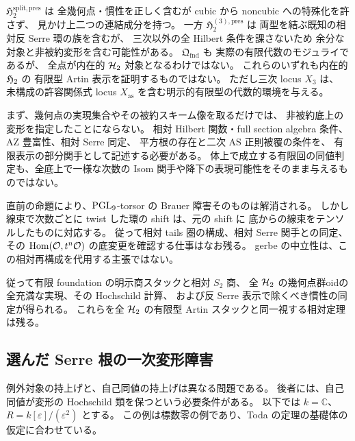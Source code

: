 \begin{remark}
$\mathfrak H_2^{\mathrm{split,pres}}$ は
全幾何点・慣性を正しく含むが
cubic から noncubic への特殊化を許さず、
見かけ上二つの連結成分を持つ。
一方 $\mathfrak H_2^{(3),\mathrm{pres}}$ は
両型を結ぶ既知の相対反 Serre 環の族を含むが、
三次以外の全 Hilbert 条件を課さないため
余分な対象と非被約変形を含む可能性がある。
$\mathfrak Q_{\mathrm{fnd}}$ も
実際の有限代数のモジュライであるが、
全点が内在的 $\mathcal H_2$ 対象となるわけではない。
これらのいずれも内在的 $\mathfrak H_2$ の
有限型 Artin 表示を証明するものではない。
ただし三次 locus $X_3$ は、
未構成の許容関係式 locus $X_{\mathrm{as}}$
を含む明示的有限型の代数的環境を与える。
\end{remark}

\begin{remark}
まず、幾何点の実現集合やその被約スキーム像を取るだけでは、
非被約底上の変形を指定したことにならない。
相対 Hilbert 関数・full section algebra 条件、AZ 豊富性、相対 Serre 同定、
平方根の存在と二次 AS 正則被覆の条件を、
有限表示の部分関手として記述する必要がある。
体上で成立する有限回の同値判定も、全底上で一様な次数の
Isom 関手や降下の表現可能性をそのまま与えるものではない。

直前の命題により、$\operatorname{PGL}_9$-torsor の Brauer 障害そのものは解消される。
しかし線束で次数ごとに twist した環の shift は、元の shift に
底からの線束をテンソルしたものに対応する。
従って相対 tails 圏の構成、相対 Serre 関手との同定、
その $\operatorname{Hom}(\mathcal O,t^n\mathcal O)$ の底変更を確認する仕事はなお残る。
gerbe の中立性は、この相対再構成を代用する主張ではない。

従って有限 foundation の明示商スタックと相対 $S_2$ 商、
全 $\mathcal H_2$ の幾何点群oidの全充満な実現、その Hochschild 計算、
および反 Serre 表示で除くべき慣性の同定が得られる。
これらを全 $\mathcal H_2$ の有限型 Artin スタックと同一視する相対定理は残る。
\end{remark}

\subsection{選んだ Serre 根の一次変形障害}
\label{subsec:chosen-root-deformation-obstruction}

例外対象の持上げと、自己同値の持上げは異なる問題である。
後者には、自己同値が変形の Hochschild 類を保つという必要条件がある。
以下では $k=\mathbb C$、$R=k[\varepsilon]/(\varepsilon^2)$ とする。
この例は標数零の例であり、Toda の定理の基礎体の仮定に合わせている。

